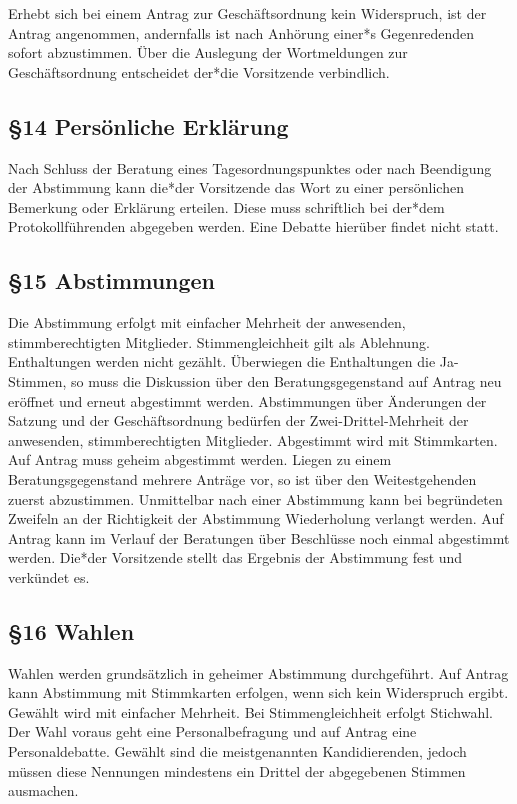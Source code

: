 \documentclass[12pt]{report}
\begin{document}
\begin{justify}
Erhebt sich bei einem Antrag zur Geschäftsordnung kein Widerspruch, ist der Antrag angenommen,
andernfalls ist nach Anhörung einer*s Gegenredenden sofort abzustimmen. Über die Auslegung der Wortmeldungen
zur Geschäftsordnung entscheidet der*die Vorsitzende verbindlich.

\subsection*{§14 Persönliche Erklärung}
Nach Schluss der Beratung eines Tagesordnungspunktes oder nach Beendigung der Abstimmung kann
die*der Vorsitzende das Wort zu einer persönlichen Bemerkung oder Erklärung erteilen. Diese muss
schriftlich bei der*dem Protokollführenden abgegeben werden. Eine Debatte hierüber findet nicht statt.
\subsection*{§15 Abstimmungen}
Die Abstimmung erfolgt mit einfacher Mehrheit der anwesenden, stimmberechtigten Mitglieder.
Stimmengleichheit gilt als Ablehnung. Enthaltungen werden nicht gezählt. Überwiegen die Enthaltungen
die Ja-Stimmen, so muss die Diskussion über den Beratungsgegenstand auf Antrag neu eröffnet und erneut
abgestimmt werden. Abstimmungen über Änderungen der Satzung und der Geschäftsordnung bedürfen der 
Zwei-Drittel-Mehrheit der anwesenden, stimmberechtigten Mitglieder. Abgestimmt wird mit Stimmkarten.
Auf Antrag muss geheim abgestimmt werden. Liegen zu einem Beratungsgegenstand mehrere Anträge vor, so ist
über den Weitestgehenden zuerst abzustimmen. Unmittelbar nach einer Abstimmung kann bei begründeten
Zweifeln an der Richtigkeit der Abstimmung Wiederholung verlangt werden. Auf Antrag kann im Verlauf der
Beratungen über Beschlüsse noch einmal abgestimmt werden. Die*der Vorsitzende stellt das Ergebnis der
Abstimmung fest und verkündet es.
\subsection*{§16 Wahlen}
Wahlen werden grundsätzlich in geheimer Abstimmung durchgeführt. Auf Antrag kann Abstimmung mit
Stimmkarten erfolgen, wenn sich kein Widerspruch ergibt. Gewählt wird mit einfacher Mehrheit. Bei
Stimmengleichheit erfolgt Stichwahl. Der Wahl voraus geht eine Personalbefragung und auf Antrag eine
Personaldebatte. Gewählt sind die meistgenannten Kandidierenden, jedoch müssen diese Nennungen mindestens
ein Drittel der abgegebenen Stimmen ausmachen.


\end{justify}
\end{document}
